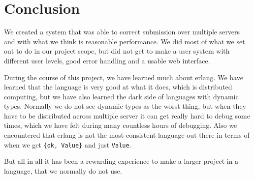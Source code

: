 \chapter{Conclusion}
We created a system that was able to correct submission over multiple servers
and with what we think is reasonable performance. We did most of what we set out
to do in our project scope, but did not get to make a user system with different
user levels, good error handling and a usable web interface.

During the course of this project, we have learned much about erlang. We have
learned that the language is very good at what it does, which is distributed
computing, but we have also learned the dark side of languages with dynamic
types. Normally we do not see dynamic types as the worst thing, but when they
have to be distributed across multiple server it can get really hard to debug
some times, which we have felt during many countless hours of debugging.
Also we encountered that erlang is not the most consistent language out there
in terms of when we get \texttt{\{ok, Value\}} and just \texttt{Value}.

But all in all it has been a rewarding experience to make a larger project in a
language, that we normally do not use.
